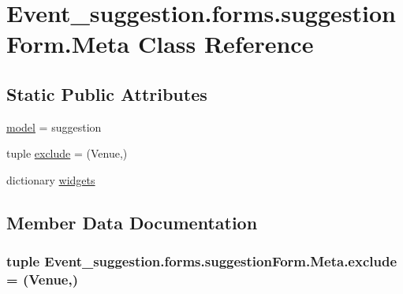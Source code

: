 \hypertarget{classEvent__suggestion_1_1forms_1_1suggestionForm_1_1Meta}{}\section{Event\+\_\+suggestion.\+forms.\+suggestion\+Form.\+Meta Class Reference}
\label{classEvent__suggestion_1_1forms_1_1suggestionForm_1_1Meta}
\subsection*{Static Public Attributes}
\begin{DoxyCompactItemize}
\item 
\hyperlink{classEvent__suggestion_1_1forms_1_1suggestionForm_1_1Meta_a00d6e6fbe0c15704a844c5d3058a9d14}{model} = suggestion
\item 
tuple \hyperlink{classEvent__suggestion_1_1forms_1_1suggestionForm_1_1Meta_aa22284432ca6d5ed4c5eafdac571c8b6}{exclude} = (\textquotesingle{}Venue\textquotesingle{},)
\item 
dictionary \hyperlink{classEvent__suggestion_1_1forms_1_1suggestionForm_1_1Meta_ab9d5ea068fbe2a4de4871b1dc9b3a7e9}{widgets}
\end{DoxyCompactItemize}


\subsection{Member Data Documentation}
\subsubsection[{\texorpdfstring{exclude}{exclude}}]{\setlength{\rightskip}{0pt plus 5cm}tuple Event\+\_\+suggestion.\+forms.\+suggestion\+Form.\+Meta.\+exclude = (\textquotesingle{}Venue\textquotesingle{},)\hspace{0.3cm}{\ttfamily [static]}}\hypertarget{classEvent__suggestion_1_1forms_1_1suggestionForm_1_1Meta_aa22284432ca6d5ed4c5eafdac571c8b6}{}\label{classEvent__suggestion_1_1forms_1_1suggestionForm_1_1Meta_aa22284432ca6d5ed4c5eafdac571c8b6}

